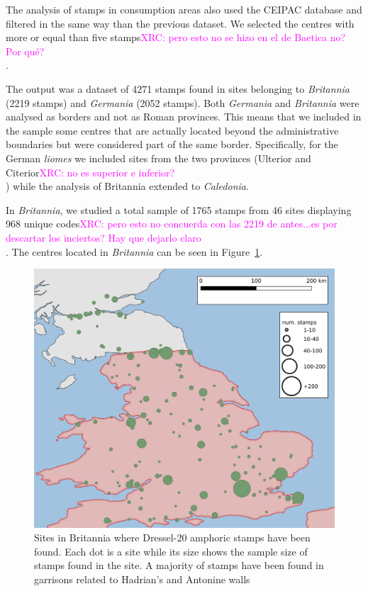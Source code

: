 \documentclass[review]{elsarticle}
\newcommand{\memo}[2]{\textcolor{#1}{#2}}
\newcommand{\xavi}[1]{\memo{magenta}{XRC: #1\\}}
\begin{document}
The analysis of stamps in consumption areas also used the CEIPAC database and filtered in the same way than the previous dataset. We selected the centres with more or equal than five stamps\xavi{pero esto no se hizo en el de Baetica no? Por qué?}.

The output was a dataset of 4271 stamps found in sites belonging to \textit{Britannia} (2219 stamps) and \textit{Germania} (2052 stamps). Both \textit{Germania} and \textit{Britannia} were analysed as borders and not as Roman provinces. This means that we included in the sample some centres that are actually located beyond the administrative boundaries but were considered part of the same border. Specifically, for the German \textit{liomes} we included sites from the two provinces (Ulterior and Citerior\xavi{no es superior e inferior?}) while the analysis of Britannia extended to \textit{Caledonia}.
 
In \textit{Britannia}, we studied a total sample of 1765 stamps from 46 sites displaying 968 unique codes\xavi{pero esto no concuerda con las 2219 de antes...es por descartar los inciertos? Hay que dejarlo claro}. The centres located in \textit{Britannia} can be seen in Figure~\ref{britannia}.
 
\begin{figure}[htp]
	\centering
\includegraphics[width=\linewidth]{figs/britannia}
\caption{Sites in Britannia where Dressel-20 amphoric stamps have been found. Each dot is a site while its size shows the sample size of stamps found in the site. A majority of stamps have been found in garrisons related to Hadrian's and Antonine walls}
\label{britannia}
\end{figure} 
\end{document}

